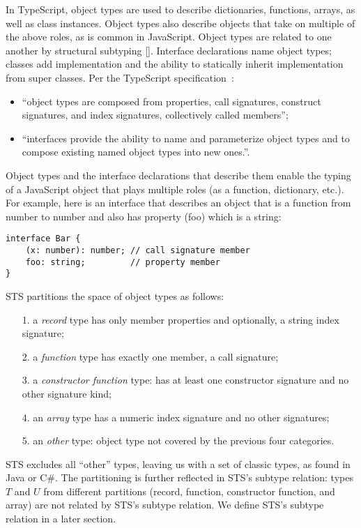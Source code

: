 In TypeScript, object types are used to describe dictionaries, functions, arrays, as well as class instances. Object 
types also describe objects that take on multiple of the above roles, as is common in JavaScript. Object types are
related to one another by structural subtyping [].  Interface declarations name object types; classes add implementation
and the ability to statically inherit implementation from super classes. Per the TypeScript specification~\cite{XYZ}:
\begin{itemize}
\item ``object types are composed from properties, call signatures, construct signatures, and index signatures, collectively called members'';
\item ``interfaces provide the ability to name and parameterize object types and to compose existing named object types into new ones.''.
\end{itemize} 
Object types and the interface declarations that describe them enable the typing of a JavaScript object that plays multiple roles
(as a function, dictionary, etc.). For example, here is an interface that describes an object that is a function from number to number
and also has property (foo) which is a string:
\begin{lstlisting}
interface Bar {
    (x: number): number; // call signature member
    foo: string;         // property member
}
\end{lstlisting}
STS partitions the space of object types as follows:
\begin{itemize}
\item[1.] a \emph{record} type has only member properties and optionally, a string index signature;
\item[2.] a \emph{function} type has exactly one member, a call signature;
\item[3.] a \emph{constructor function} type: has at least one constructor signature and no other signature kind;
\item[4.] an \emph{array} type has a numeric index signature and no other signatures;
\item[5.] an \emph{other} type: object type not covered by the previous four categories.
\end{itemize}
STS excludes all ``other'' types, leaving us with a set of classic types, as found in Java or C\#.
The partitioning is further reflected in STS's subtype relation: 
types $T$ and $U$ from different partitions (record, function, constructor function, and array) 
are not related by STS's subtype relation.  We define STS's subtype relation in a later section.

